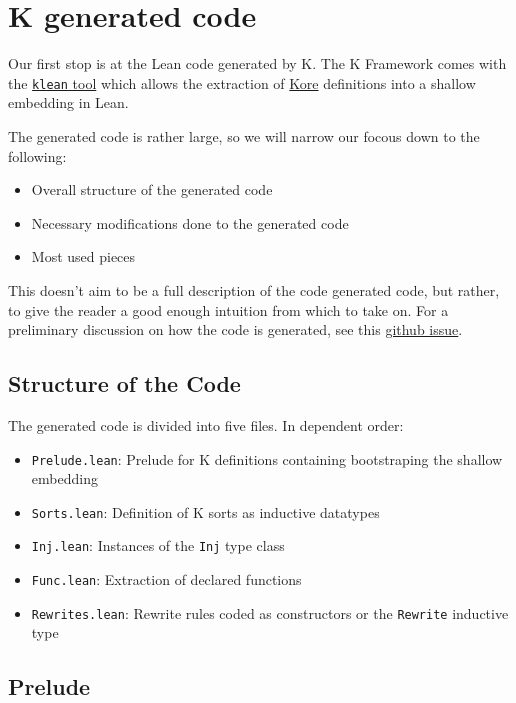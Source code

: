 \chapter{K generated code}\label{chap:gencode}

Our first stop is at the Lean code generated by K. The K Framework comes with
the
\href{https://github.com/runtimeverification/k/tree/master/pyk/src/pyk/klean}{\texttt{klean}
tool} which allows the extraction of
\href{https://kframework.org/docs/user_manual/#k-process-overview}{Kore}
definitions into a shallow embedding in Lean.

The generated code is rather
large, so we will narrow our focous down to the following:

\begin{itemize}
\item Overall structure of the generated code
\item Necessary modifications done to the generated code
\item Most used pieces
\end{itemize}

This doesn't aim to be a full description of the code generated code, but
rather, to give the reader a good enough intuition from which to take on. For a
preliminary discussion on how the code is generated, see this
\href{https://github.com/runtimeverification/k/issues/4552}{github issue}.

\section{Structure of the Code}

The generated code is divided into five files. In dependent order:

\begin{itemize}
\item \texttt{Prelude.lean}: Prelude for K definitions containing bootstraping
  the shallow embedding
\item \texttt{Sorts.lean}: Definition of K sorts as inductive datatypes
\item \texttt{Inj.lean}: Instances of the \texttt{Inj} type class
\item \texttt{Func.lean}: Extraction of declared functions
\item \texttt{Rewrites.lean}: Rewrite rules coded as constructors or the
  \texttt{Rewrite} inductive type
\end{itemize}

\section{Prelude}


